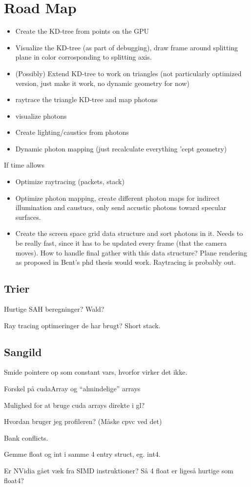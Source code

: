 \section*{Road Map}

\begin{itemize}
\item Create the KD-tree from points on the GPU
\item Visualize the KD-tree (as part of debugging), draw frame around
  splitting plane in color corrosponding to splitting axis.
\item (Possibly) Extend KD-tree to work on triangles (not particularly optimized
  version, just make it work, no dynamic geometry for now)
\item raytrace the triangle KD-tree and map photons
\item visualize photons
\item Create lighting/caustics from photons
\item Dynamic photon mapping (just recalculate everything 'cept geometry)
\end{itemize}

If time allows

\begin{itemize}
\item Optimize raytracing (packets, stack)
\item Optimize photon mapping, create different photon maps for
  indirect illumination and caustucs, only send accustic photons
  toward specular surfaces.
\item Create the screen space grid data structure and sort photons in
  it. Needs to be really fast, since it has to be updated every frame
  (that the camera moves). How to handle final gather with this data
  structure? Plane rendering as proposed in Bent's phd thesis would
  work. Raytracing is probably out.
\end{itemize}



\subsection*{Trier}


Hurtige SAH beregninger? Wald?

Ray tracing optimeringer de har brugt? Short stack.


\subsection*{Sangild}

Smide pointere op som constant vars, hvorfor virker det ikke.

Forskel på cudaArray og ``almindelige'' arrays

Mulighed for at bruge cuda arrays direkte i gl?

Hvordan bruger jeg profileren? (Måske cpvc ved det)

Bank conflicts.

Gemme float og int i samme 4 entry struct, eg. int4.

Er NVidia gået væk fra SIMD instruktioner? Så 4 float er ligeså
hurtige som float4?
